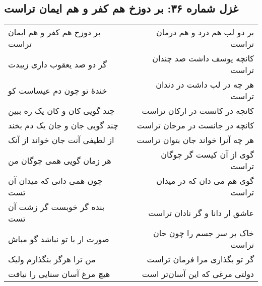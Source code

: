 \begin{center}
\section*{غزل شماره ۳۶: بر دوزخ هم کفر و هم ایمان تراست}
\label{sec:036}
\begin{longtable}{l p{0.5cm} r}
بر دوزخ هم کفر و هم ایمان تراست
&&
بر دو لب هم درد و هم درمان تراست
\\
گر دو صد یعقوب داری زیبدت
&&
کانچه یوسف داشت صد چندان تراست
\\
خندهٔ تو چون دم عیساست کو
&&
هر چه در لب داشت در دندان تراست
\\
چند گویی کان و کان یک ره ببین
&&
کانچه در کانست در ارکان تراست
\\
چند گویی جان و جان یک دم بخند
&&
کانچه در جانست در مرجان تراست
\\
از لطیفی آنت جان خواند از آنک
&&
هر چه آنرا خواند جان بتوان تراست
\\
هر زمان گویی همی چوگان من
&&
گوی از آن کیست گر چوگان تراست
\\
چون همی دانی که میدان آن تست
&&
گوی هم می دان که در میدان تراست
\\
بنده گر خوبست گر زشت آن تست
&&
عاشق ار دانا و گر نادان تراست
\\
صورت ار با تو نباشد گو مباش
&&
خاک بر سر جسم را چون جان تراست
\\
من ترا هرگز بنگذارم ولیک
&&
گر تو بگذاری مرا فرمان تراست
\\
هیچ مرغ آسان سنایی را نیافت
&&
دولتی مرغی که این آسان‌تر است
\\
\end{longtable}
\end{center}
